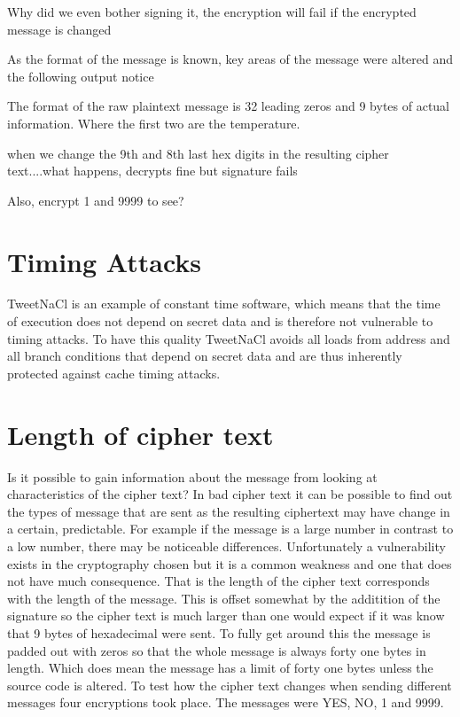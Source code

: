 Why did we even bother signing it, the encryption will fail if the encrypted message is changed

As the format of the message is known, key areas of the message were altered and the following output notice

The format of the raw plaintext message is 32 leading zeros and 9 bytes of actual information. Where the first two are the temperature. 

when we change the 9th and 8th last hex digits in the resulting cipher text....what happens, decrypts fine but signature fails


Also, encrypt 1 and 9999 to see?


\section{Timing Attacks}

TweetNaCl is an example of constant time software, which means that the time of execution does not depend on secret data and is therefore not vulnerable to timing attacks. To have this quality TweetNaCl avoids all loads from address and all branch conditions that depend on secret data and are thus inherently protected against cache timing attacks. 

\section{Length of cipher text}

Is it possible to gain information about the message from looking at characteristics of the cipher text? In bad cipher text it can be possible to find out the types of message that are sent as the resulting ciphertext may have change in a certain, predictable. For example if the message is a large number in contrast to a low number, there may be noticeable differences. Unfortunately a vulnerability exists in the cryptography chosen but it is a common weakness and one that does not have much consequence. That is the length of the cipher text corresponds with the length of the message. This is offset somewhat by the additition of the signature so the cipher text is much larger than one would expect if it was know that 9 bytes of hexadecimal were sent. To fully get around this the message is padded out with zeros so that the whole message is always forty one bytes in length. Which does mean the message has a limit of forty one bytes unless the source code is altered. To test how the cipher text changes when sending different messages four encryptions took place. The messages were YES, NO, 1 and 9999. 

